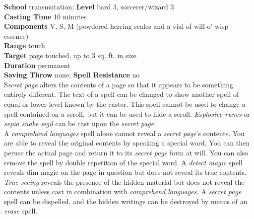\textbf{School} transmutation; \textbf{Level} bard 3, sorcerer/wizard 3\\
\textbf{Casting Time} 10 minutes\\
\textbf{Components} V, S, M (powdered herring scales and a vial of will-o'-wisp essence)\\
\textbf{Range} touch\\
\textbf{Target} page touched, up to 3 sq. ft. in size\\
\textbf{Duration} permanent\\
\textbf{Saving Throw} none; \textbf{Spell Resistance} no\\
S\textit{ecret page }alters the contents of a page so that it appears to be something entirely different. The text of a spell can be changed to show another spell of equal or lower level known by the caster. This spell cannot be used to change a spell contained on a scroll, but it can be used to hide a scroll. \textit{Explosive runes }or \textit{sepia snake sigil }can be cast upon the \textit{secret page.}\\
A \textit{comprehend languages }spell alone cannot reveal a \textit{secret page}'s contents. You are able to reveal the original contents by speaking a special word. You can then peruse the actual page and return it to its \textit{secret page }form at will. You can also remove the spell by double repetition of the special word. A \textit{detect magic }spell reveals dim magic on the page in question but does not reveal its true contents. \textit{True seeing }reveals the presence of the hidden material but does not reveal the contents unless cast in combination with \textit{comprehend languages. }A \textit{secret page }spell can be dispelled, and the hidden writings can be destroyed by means of an \textit{erase }spell.\\
